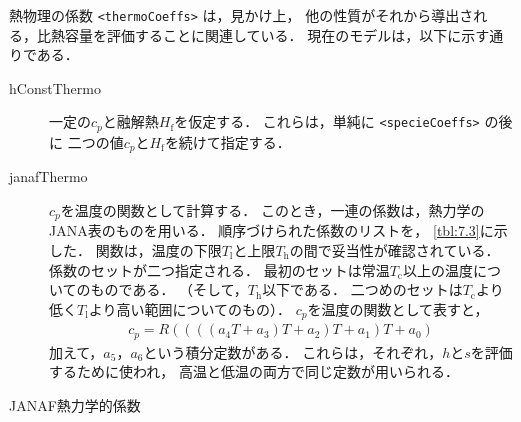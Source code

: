 熱物理の係数 \verb|<thermoCoeffs>| は，見かけ上，
他の性質がそれから導出される，比熱容量を評価することに関連している．
現在のモデルは，以下に示す通りである．
\begin{description}
 \item[hConstThermo]
            一定の$c_{p}$と融解熱$H_{\mathrm{f}}$を仮定する．
            これらは，単純に \verb|<specieCoeffs>| の後に
            二つの値$c_{p}$と$H_{\mathrm{f}}$を続けて指定する．
 \item[janafThermo]
            $c_{p}$を温度の関数として計算する．
            このとき，一連の係数は，熱力学のJANA表のものを用いる．
            順序づけられた係数のリストを，
            \autoref{tbl:7.3}に示した．
            関数は，温度の下限$T_{\mathrm{l}}$と上限$T_{\mathrm{h}}$の間で妥当性が確認されている．
            係数のセットが二つ指定される．
            最初のセットは常温$T_{\mathrm{c}}$以上の温度についてのものである．
            （そして，$T_{\mathrm{h}}$以下である．
            二つめのセットは$T_{\mathrm{c}}$より低く$T_{\mathrm{l}}$より高い範囲についてのもの）．
            $c_{p}$を温度の関数として表すと，
\begin{align}
 \label{eq:7.1}
 c_{p} = R((((a_{4}T + a_{3})T + a_{2})T + a_{1})T + a_{0})
\end{align}
            加えて，$a_{5}$，$a_{6}$という積分定数がある．
            これらは，それぞれ，$h$と$s$を評価するために使われ，
            高温と低温の両方で同じ定数が用いられる．
\end{description}


\begin{table}[ht]
 
 \caption{JANAF熱力学的係数}
 \label{tbl:7.3}
\end{table}


